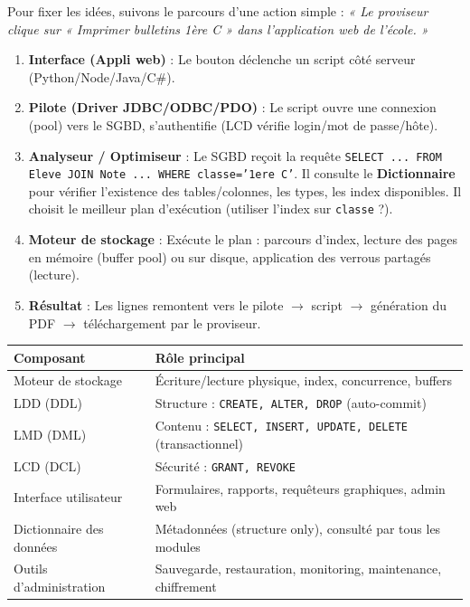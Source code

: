 \documentclass[11pt]{article}
\newcommand{\cle}[1]{{\popxbold\color{popdark}#1}}
\begin{document}
Pour fixer les idées, suivons le parcours d'une action simple : \emph{« Le proviseur clique sur « Imprimer bulletins 1ère C » dans l'application web de l'école. »}

\begin{enumerate}
    \item \textbf{Interface (Appli web)} : Le bouton déclenche un script côté serveur (Python/Node/Java/C\#).
    \item \textbf{Pilote (Driver JDBC/ODBC/PDO)} : Le script ouvre une connexion (pool) vers le SGBD, s'authentifie (LCD vérifie login/mot de passe/hôte).
    \item \textbf{Analyseur / Optimiseur} : Le SGBD reçoit la requête \texttt{SELECT ... FROM Eleve JOIN Note ... WHERE classe='1ere C'}. Il consulte le \textbf{Dictionnaire} pour vérifier l'existence des tables/colonnes, les types, les index disponibles. Il choisit le meilleur plan d'exécution (utiliser l'index sur \texttt{classe} ?).
    \item \textbf{Moteur de stockage} : Exécute le plan : parcours d'index, lecture des pages en mémoire (buffer pool) ou sur disque, application des verrous partagés (lecture).
    \item \textbf{Résultat} : Les lignes remontent vers le pilote $\rightarrow$ script $\rightarrow$ génération du PDF $\rightarrow$ téléchargement par le proviseur.
\end{enumerate}

\begin{aretenir}
\begin{center}
\begin{tabularx}{\linewidth}{|l|X|}\hline
\textbf{Composant} & \textbf{Rôle principal} \\\hline
\cle{Moteur de stockage} & Écriture/lecture physique, index, concurrence, buffers \\\hline
\cle{LDD (DDL)} & Structure : \texttt{CREATE, ALTER, DROP} (auto-commit) \\\hline
\cle{LMD (DML)} & Contenu : \texttt{SELECT, INSERT, UPDATE, DELETE} (transactionnel) \\\hline
\cle{LCD (DCL)} & Sécurité : \texttt{GRANT, REVOKE} \\\hline
\cle{Interface utilisateur} & Formulaires, rapports, requêteurs graphiques, admin web \\\hline
\cle{Dictionnaire des données} & Métadonnées (structure only), consulté par tous les modules \\\hline
\cle{Outils d'administration} & Sauvegarde, restauration, monitoring, maintenance, chiffrement \\\hline
\end{tabularx}
\end{center}
\end{aretenir}
\end{document}
